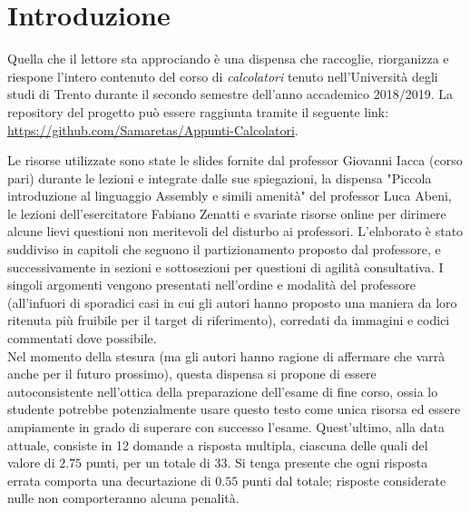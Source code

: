 \documentclass[class=book, crop=false, oneside]{standalone}
\begin{document}
\chapter*{Introduzione}
 

Quella che il lettore sta approciando è una dispensa che raccoglie, riorganizza e riespone l'intero contenuto del corso di \emph{calcolatori} tenuto nell'Università degli studi di Trento durante il secondo semestre dell'anno accademico 2018/2019. La repository del progetto può essere raggiunta tramite il seguente link: \url{https://github.com/Samaretas/Appunti-Calcolatori}.

Le risorse utilizzate sono state le slides fornite dal professor Giovanni Iacca (corso pari) durante le lezioni e integrate dalle sue spiegazioni, la dispensa "Piccola introduzione al linguaggio Assembly e simili amenità" del professor Luca Abeni, le lezioni dell'esercitatore Fabiano Zenatti e svariate risorse online per dirimere alcune lievi questioni non meritevoli del disturbo ai professori. L'elaborato è stato suddiviso in capitoli che seguono il partizionamento proposto dal professore, e successivamente in sezioni e sottosezioni per questioni di agilità consultativa. I singoli argomenti vengono presentati nell'ordine e modalità del professore (all'infuori di sporadici casi in cui gli autori hanno proposto una maniera da loro ritenuta più fruibile per il target di riferimento), corredati da immagini e codici commentati dove possibile.\\

Nel momento della stesura (ma gli autori hanno ragione di affermare che varrà anche per il futuro prossimo), questa dispensa si propone di essere autoconsistente nell'ottica della preparazione dell'esame di fine corso, ossia lo studente potrebbe potenzialmente usare questo testo come unica risorsa ed essere ampiamente in grado di superare con successo l'esame. Quest'ultimo, alla data attuale, consiste in 12 domande a risposta multipla, ciascuna delle quali del valore di \(2.75\) punti, per un totale di \(33\). Si tenga presente che ogni risposta errata comporta una decurtazione di \(0.55\) punti dal totale; risposte considerate nulle non comporteranno alcuna penalità.\\
\end{document}
